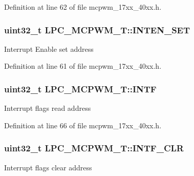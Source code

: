 Definition at line 62 of file mcpwm\+\_\+17xx\+\_\+40xx.\+h.

\subsubsection[{\texorpdfstring{I\+N\+T\+E\+N\+\_\+\+S\+ET}{INTEN_SET}}]{ uint32\+\_\+t L\+P\+C\+\_\+\+M\+C\+P\+W\+M\+\_\+\+T\+::\+I\+N\+T\+E\+N\+\_\+\+S\+ET}\hypertarget{structLPC__MCPWM__T_ab678eeb9fa0e190473e58d179778a249}{}\label{structLPC__MCPWM__T_ab678eeb9fa0e190473e58d179778a249}
Interrupt Enable set address 

Definition at line 61 of file mcpwm\+\_\+17xx\+\_\+40xx.\+h.

\subsubsection[{\texorpdfstring{I\+N\+TF}{INTF}}]{ uint32\+\_\+t L\+P\+C\+\_\+\+M\+C\+P\+W\+M\+\_\+\+T\+::\+I\+N\+TF}\hypertarget{structLPC__MCPWM__T_a0bfcbbed2fabcf16419d014ff01e8e37}{}\label{structLPC__MCPWM__T_a0bfcbbed2fabcf16419d014ff01e8e37}
Interrupt flags read address 

Definition at line 66 of file mcpwm\+\_\+17xx\+\_\+40xx.\+h.

\subsubsection[{\texorpdfstring{I\+N\+T\+F\+\_\+\+C\+LR}{INTF_CLR}}]{ uint32\+\_\+t L\+P\+C\+\_\+\+M\+C\+P\+W\+M\+\_\+\+T\+::\+I\+N\+T\+F\+\_\+\+C\+LR}\hypertarget{structLPC__MCPWM__T_acd49890931c9446a54e8070478cf7185}{}\label{structLPC__MCPWM__T_acd49890931c9446a54e8070478cf7185}
Interrupt flags clear address 

